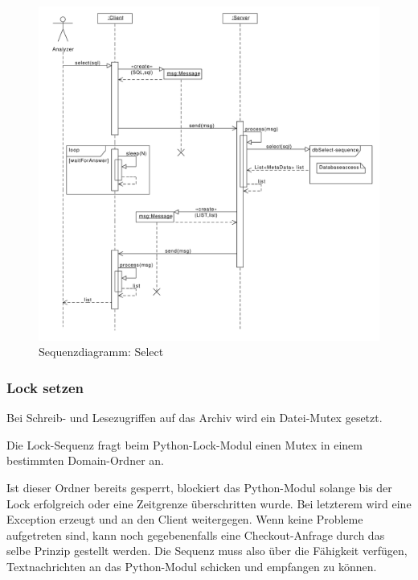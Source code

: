 \begin{figure}[H]
	\centering
	\label{dia:design:frontend:sqc:select}
	\includegraphics[width=\textwidth]{design/frontend/sequence/select-sequence.pdf}
	\caption{Sequenzdiagramm: Select}
\end{figure}

\subsubsection{Lock setzen}

Bei Schreib- und Lesezugriffen auf das Archiv wird ein Datei-Mutex gesetzt.

Die Lock-Sequenz fragt beim Python-Lock-Modul einen Mutex in einem bestimmten Domain-Ordner an.

Ist dieser Ordner bereits gesperrt, blockiert das Python-Modul solange bis der Lock erfolgreich oder eine Zeitgrenze überschritten wurde.
Bei letzterem wird eine Exception erzeugt und an den Client weitergegen.
Wenn keine Probleme aufgetreten sind, kann noch gegebenenfalls eine Checkout-Anfrage durch das selbe Prinzip gestellt werden.
Die Sequenz muss also über die Fähigkeit verfügen, Textnachrichten an das Python-Modul schicken und empfangen zu können.


